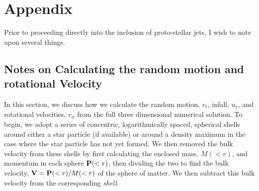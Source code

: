 \documentclass[../dissertation.tex]{subfiles}
\begin{document}
%
%
%
%
%
\section{Appendix} 
Prior to proceeding directly into the inclusion of proto-stellar jets, I wish to note upon several things.

\subsection{Notes on Calculating the random motion and rotational Velocity}
\label{Sec:Hydro_velocity}

In this section, we discuss how we calculate the random motion, $v_t$, infall, $u_r$, and rotational velocities, $v_{\phi}$ from the full three dimensional numerical solution.  To begin, we adopt a series of concentric, logarithmically spaced, spherical shells around either a star particle (if available) or around a density maximum in the case where the star particle has not yet formed. We then removed the bulk velocity from these shells by first calculating the enclosed mass, $M(<r)$, and momentum in each sphere ${\bf P}(<r)$, then dividing the two to find the bulk velocity, ${\bf V} = {\bf P}(<r)/M(<r)$ of the sphere of matter. We then subtract this bulk velocity from the corresponding {\em shell}. 
\end{document}
